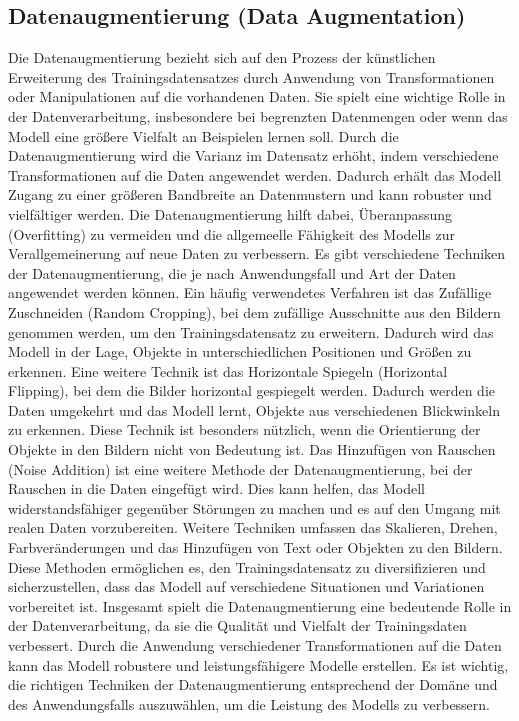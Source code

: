 \subsection{Datenaugmentierung (Data Augmentation)}

    Die Datenaugmentierung bezieht sich auf den Prozess der künstlichen Erweiterung des Trainingsdatensatzes durch Anwendung von Transformationen oder Manipulationen auf die vorhandenen Daten. Sie spielt eine wichtige Rolle in der Datenverarbeitung, insbesondere bei begrenzten Datenmengen oder wenn das Modell eine größere Vielfalt an Beispielen lernen soll.    
    Durch die Datenaugmentierung wird die Varianz im Datensatz erhöht, indem verschiedene Transformationen auf die Daten angewendet werden. Dadurch erhält das Modell Zugang zu einer größeren Bandbreite an Datenmustern und kann robuster und vielfältiger werden. 
    Die Datenaugmentierung hilft dabei, Überanpassung (Overfitting) zu vermeiden und die allgemeelle Fähigkeit des Modells zur Verallgemeinerung auf neue Daten zu verbessern.    
    Es gibt verschiedene Techniken der Datenaugmentierung, die je nach Anwendungsfall und Art der Daten angewendet werden können. 
    Ein häufig verwendetes Verfahren ist das Zufällige Zuschneiden (Random Cropping), bei dem zufällige Ausschnitte aus den Bildern genommen werden, um den Trainingsdatensatz zu erweitern. 
    Dadurch wird das Modell in der Lage, Objekte in unterschiedlichen Positionen und Größen zu erkennen.    
    Eine weitere Technik ist das Horizontale Spiegeln (Horizontal Flipping), bei dem die Bilder horizontal gespiegelt werden. Dadurch werden die Daten umgekehrt und das Modell lernt, Objekte aus verschiedenen Blickwinkeln zu erkennen. 
    Diese Technik ist besonders nützlich, wenn die Orientierung der Objekte in den Bildern nicht von Bedeutung ist.    
    Das Hinzufügen von Rauschen (Noise Addition) ist eine weitere Methode der Datenaugmentierung, bei der Rauschen in die Daten eingefügt wird.
    Dies kann helfen, das Modell widerstandsfähiger gegenüber Störungen zu machen und es auf den Umgang mit realen Daten vorzubereiten.    
    Weitere Techniken umfassen das Skalieren, Drehen, Farbveränderungen und das Hinzufügen von Text oder Objekten zu den Bildern. 
    Diese Methoden ermöglichen es, den Trainingsdatensatz zu diversifizieren und sicherzustellen, dass das Modell auf verschiedene Situationen und Variationen vorbereitet ist.    
    Insgesamt spielt die Datenaugmentierung eine bedeutende Rolle in der Datenverarbeitung, da sie die Qualität und Vielfalt der Trainingsdaten verbessert. 
    Durch die Anwendung verschiedener Transformationen auf die Daten kann das Modell robustere und leistungsfähigere Modelle erstellen. 
    Es ist wichtig, die richtigen Techniken der Datenaugmentierung entsprechend der Domäne und des Anwendungsfalls auszuwählen, um die Leistung des Modells zu verbessern.

